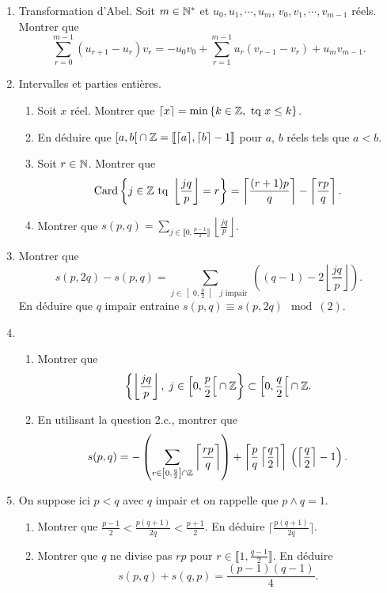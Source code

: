 \begin{enumerate}
  \item Transformation d'Abel.\newline
Soit $m \in \mathbb{N}^*$ et $u_0, u_1, \cdots, u_m$, $v_0, v_1, \cdots, v_{m-1}$ réels. Montrer que
\[
  \sum_{r = 0}^{m-1}(u_{r+1} - u_r)v_r = -u_0v_0 + \sum_{r=1}^{m-1}u_r(v_{r-1} - v_r) + u_m v_{m-1}.
\]
  \item Intervalles et parties entières.
\begin{enumerate}
  \item Soit $x$ réel. Montrer que $\lceil x \rceil = \min\left\lbrace k \in \mathbb{Z}, \text{ tq }x \leq k\right\rbrace$.
  \item En déduire que $\left[ a, b\right[ \cap \mathbb{Z} = \llbracket \lceil a \rceil , \lceil b \rceil - 1 \rrbracket$ pour $a$, $b$ réels tels que $a < b$.
  \item Soit $r \in \mathbb{N}$. Montrer que 
\[
  \operatorname{Card} \left\lbrace j \in \mathbb{Z} \text{ tq } \left\lfloor \frac{jq}{p}\right\rfloor = r \right\rbrace = \left\lceil \frac{(r+1)p}{q}\right\rceil -\left\lceil \frac{rp}{q}\right\rceil .
\]
  \item Montrer que $s(p,q) = \sum_{j \in \llbracket 0, \frac{p-1}{2}\rrbracket}\left\lfloor \frac{j q}{p}\right\rfloor$.

\end{enumerate}
  
  \item Montrer que 
\[
  s(p,2q) - s(p,q) = \sum_{j \in \left] 0, \frac{p}{2}\right[ \text{ $j$ impair }} \left( (q-1) -2\left\lfloor \frac{jq}{p}\right\rfloor \right).
\]
En déduire que $q$ impair entraine $s(p,q) \equiv s(p,2q) \mod (2)$.

  \item
  \begin{enumerate}
    \item Montrer que 
\[
  \left\lbrace \left\lfloor \frac{jq}{p} \right\rfloor ,\; j \in \left[ 0, \frac{p}{2}\right[ \cap \mathbb{Z} \right\rbrace 
  \subset \left[ 0, \frac{q}{2}\right[ \cap \mathbb{Z}. 
\]
    \item En utilisant la question 2.c., montrer que
\[
  s(p,q) 
  = - \left(\sum_{r \in \left[0, \frac{q}{2}\right] \cap \mathbb{Z}}\left\lceil \frac{rp}{q}\right\rceil \right)
  + \left\lceil \frac{p}{q}\left\lceil \frac{q}{2}\right\rceil\right\rceil\,\left( \left\lceil\frac{q}{2}\right\rceil -1\right).
\]
  \end{enumerate}
  
  \item On suppose ici $p<q$ avec $q$ impair et on rappelle que $p\wedge q =1$.
  \begin{enumerate}
    \item Montrer que $\frac{p-1}{2} < \frac{p(q+1)}{2q} < \frac{p+1}{2}$. En déduire $\lceil \frac{p(q+1)}{2q} \rceil$.
    \item Montrer que $q$ ne divise pas $rp$ pour $r \in \llbracket 1, \frac{q-1}{2}\rrbracket$. En déduire 
\[
s(p,q) + s(q,p) = \frac{(p-1)(q-1)}{4}.
\]
  \end{enumerate}

\end{enumerate}

